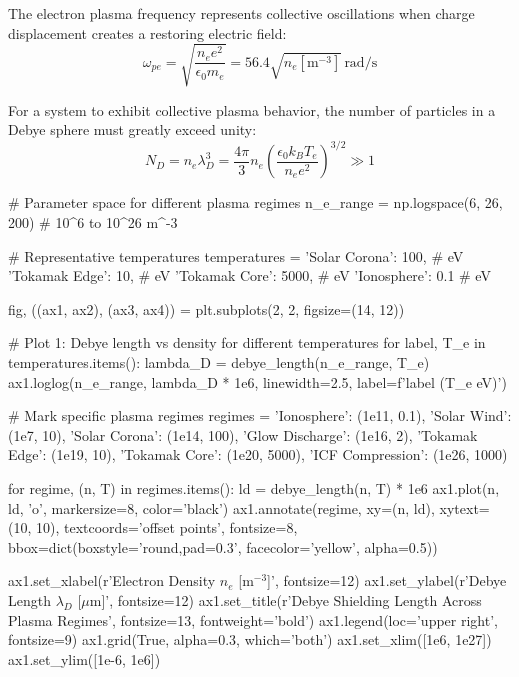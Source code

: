 \documentclass[11pt,a4paper]{article}
\begin{document}
The electron plasma frequency represents collective oscillations when charge displacement creates a restoring electric field:
\begin{equation}
\omega_{pe} = \sqrt{\frac{n_e e^2}{\epsilon_0 m_e}} = 56.4 \sqrt{n_e[\text{m}^{-3}]} \, \text{rad/s}
\end{equation}

For a system to exhibit collective plasma behavior, the number of particles in a Debye sphere must greatly exceed unity:
\begin{equation}
N_D = n_e \lambda_D^3 = \frac{4\pi}{3} n_e \left(\frac{\epsilon_0 k_B T_e}{n_e e^2}\right)^{3/2} \gg 1
\end{equation}

\begin{pycode}
# Parameter space for different plasma regimes
n_e_range = np.logspace(6, 26, 200)  # 10^6 to 10^26 m^-3

# Representative temperatures
temperatures = {
    'Solar Corona': 100,  # eV
    'Tokamak Edge': 10,   # eV
    'Tokamak Core': 5000, # eV
    'Ionosphere': 0.1     # eV
}

fig, ((ax1, ax2), (ax3, ax4)) = plt.subplots(2, 2, figsize=(14, 12))

# Plot 1: Debye length vs density for different temperatures
for label, T_e in temperatures.items():
    lambda_D = debye_length(n_e_range, T_e)
    ax1.loglog(n_e_range, lambda_D * 1e6, linewidth=2.5, label=f'{label} ({T_e} eV)')

# Mark specific plasma regimes
regimes = {
    'Ionosphere': (1e11, 0.1),
    'Solar Wind': (1e7, 10),
    'Solar Corona': (1e14, 100),
    'Glow Discharge': (1e16, 2),
    'Tokamak Edge': (1e19, 10),
    'Tokamak Core': (1e20, 5000),
    'ICF Compression': (1e26, 1000)
}

for regime, (n, T) in regimes.items():
    ld = debye_length(n, T) * 1e6
    ax1.plot(n, ld, 'o', markersize=8, color='black')
    ax1.annotate(regime, xy=(n, ld), xytext=(10, 10),
                textcoords='offset points', fontsize=8,
                bbox=dict(boxstyle='round,pad=0.3', facecolor='yellow', alpha=0.5))

ax1.set_xlabel(r'Electron Density $n_e$ [m$^{-3}$]', fontsize=12)
ax1.set_ylabel(r'Debye Length $\lambda_D$ [$\mu$m]', fontsize=12)
ax1.set_title(r'Debye Shielding Length Across Plasma Regimes', fontsize=13, fontweight='bold')
ax1.legend(loc='upper right', fontsize=9)
ax1.grid(True, alpha=0.3, which='both')
ax1.set_xlim([1e6, 1e27])
ax1.set_ylim([1e-6, 1e6])


\end{pycode}
\end{document}
